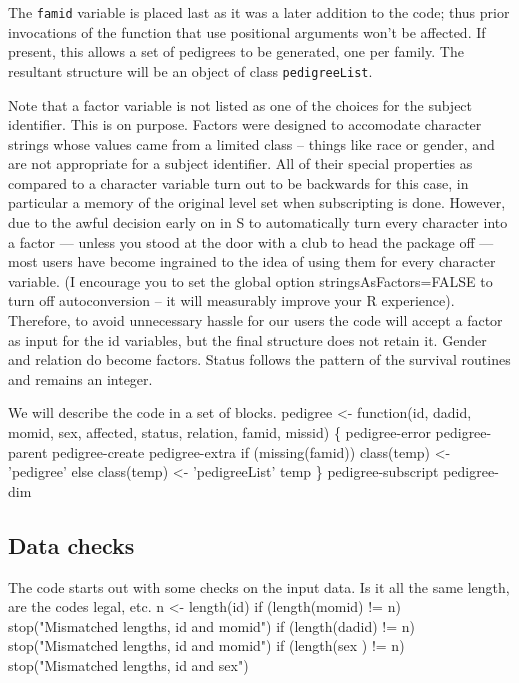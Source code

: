 \documentclass{article}
\begin{document}
The {\tt{}famid} variable is placed last as it was a later addition to the
code; thus prior invocations of the function that use positional 
arguments won't be affected.                                       %
If present, this allows a set of pedigrees to be generated, one per
family.  The resultant structure will be an object of class
{\tt{}pedigreeList}.

Note that a factor variable is not listed as one of the choices for the
subject identifier. This is on purpose.  Factors
were designed to accomodate character strings whose values came from a limited
class -- things like race or gender, and are not appropriate for a subject
identifier.  All of their special properties as compared to a character
variable turn out to be backwards for this case, in particular a memory
of the original level set when subscripting is done.
However, due to the awful decision early on in S to automatically turn every
character into a factor --- unless you stood at the door with a club to
head the package off --- most users have become ingrained to the idea of
using them for every character variable. 
(I encourage you to set the global option stringsAsFactors=FALSE to turn
off autoconversion -- it will measurably improve your R experience).
Therefore, to avoid unnecessary hassle for our users 
the code will accept a factor as input for the id variables, but
the final structure does not retain it.  
Gender and relation do become factors.  Status follows the pattern of the 
survival routines and remains an integer.

We will describe the code in a set of blocks.
\endmoddef
pedigree <- function(id, dadid, momid, sex, affected, status, relation,
                     famid, missid) \{
    \LA{}pedigree-error\RA{}
    \LA{}pedigree-parent\RA{}
    \LA{}pedigree-create\RA{}
    \LA{}pedigree-extra\RA{}
    if (missing(famid)) class(temp) <- 'pedigree'
    else class(temp) <- 'pedigreeList'
    temp
    \}
\LA{}pedigree-subscript\RA{}
\LA{}pedigree-dim\RA{}
\nwendcode{}\nwdocspar

\subsection{Data checks}
The code starts out with some checks on the input data.  
Is it all the same length, are the codes legal, etc.
\nwenddocs{}\endmoddef
n <- length(id)
if (length(momid) != n) stop("Mismatched lengths, id and momid")
if (length(dadid) != n) stop("Mismatched lengths, id and momid")
if (length(sex  ) != n) stop("Mismatched lengths, id and sex")
\end{document}
